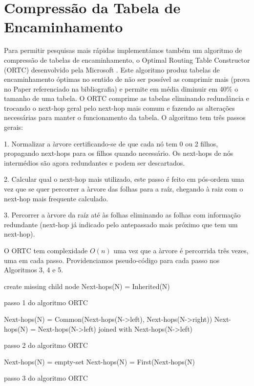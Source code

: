 \documentclass[10pt,a4paper]{article}
\begin{document}
\section{Compressão da Tabela de Encaminhamento}
	Para permitir pesquisas mais rápidas implementámos também um algoritmo de compressão de tabelas de encaminhamento, o Optimal Routing Table Constructor (ORTC) desenvolvido pela Microsoft \cite{DravesKSZ99}. Este algoritmo produz tabelas de encaminhamento óptimas no sentido de não ser possível as comprimir mais (prova no Paper referenciado na bibliografia) e permite em média diminuir em 40\% o tamanho de uma tabela.
	O ORTC comprime as tabelas eliminando redundância e trocando o next-hop geral pelo next-hop mais comum e fazendo as alterações necessárias para manter o funcionamento da tabela. O algoritmo tem três passos gerais: 
	
	1. Normalizar a àrvore certificando-se de que cada nó tem 0 ou 2 filhos, propagando next-hops para os filhos quando necessário. Os next-hops de nós intermédios são agora redundantes e podem ser descartados.   
	
	2. Calcular qual o next-hop mais utilizado, este passo é feito em pós-ordem uma vez que se quer percorrer a àrvore das folhas para a raíz, chegando à raiz com o next-hop mais frequente calculado.
	
	3. Percorrer a àrvore da raíz até às folhas eliminando as folhas com informação redundante (next-hop já indicado pelo antepassado mais próximo que tem um next-hop).
	
	O ORTC tem complexidade $O(n)$ uma vez que a àrvore é percorrida três vezes, uma em cada passo. Providenciamos pseudo-código para cada passo nos Algoritmos 3, 4 e 5.
	
\begin{algorithm}
\label{algo:ORTC_step1}
{
	{
		create missing child node
	}
	{
		Next-hops(N) = Inherited(N)	
	}
}
\caption{passo 1 do algoritmo ORTC}
\end{algorithm}

\begin{algorithm}
\label{algo:ORTC_step2}
{
	{
		Next-hops(N) = Common(Next-hops(N->left), Next-hops(N->right))
	}
	\uElse
	{
		Next-hops(N) = Next-hops(N->left) joined with Next-hops(N->left) 	
	}
}
\caption{passo 2 do algoritmo ORTC}
\end{algorithm}


\begin{algorithm}
\label{algo:ORTC_step3}
{
	{
		Next-hops(N) = empty-set
	}
	\uElse
	{
		Next-hops(N) = First(Next-hops(N)	
	}
}
\caption{passo 3 do algoritmo ORTC}
\end{algorithm}


\end{document}
